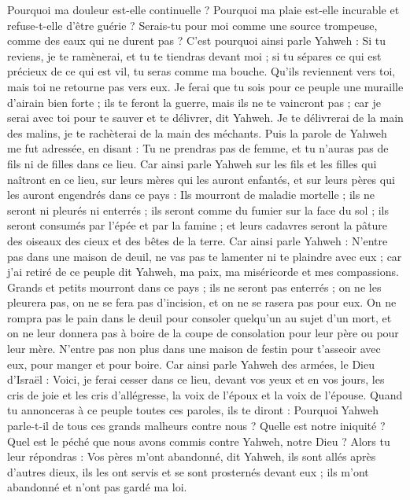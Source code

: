\begin{multicols}{2}
Pourquoi ma douleur est-elle continuelle ? Pourquoi ma plaie est-elle incurable et refuse-t-elle d'être guérie ? Serais-tu pour moi comme une source trompeuse, comme des eaux qui ne durent pas ?
C'est pourquoi ainsi parle Yahweh : Si tu reviens, je te ramènerai, et tu te tiendras devant moi ; si tu sépares ce qui est précieux de ce qui est vil, tu seras comme ma bouche. Qu'ils reviennent vers toi, mais toi ne retourne pas vers eux.
Je ferai que tu sois pour ce peuple une muraille d'airain bien forte ; ils te feront la guerre, mais ils ne te vaincront pas ; car je serai avec toi pour te sauver et te délivrer, dit Yahweh.
Je te délivrerai de la main des malins, je te rachèterai de la main des méchants.
\VerseOne{}Puis la parole de Yahweh me fut adressée, en disant :
Tu ne prendras pas de femme, et tu n'auras pas de fils ni de filles dans ce lieu.
Car ainsi parle Yahweh sur les fils et les filles qui naîtront en ce lieu, sur leurs mères qui les auront enfantés, et sur leurs pères qui les auront engendrés dans ce pays :
Ils mourront de maladie mortelle ; ils ne seront ni pleurés ni enterrés ; ils seront comme du fumier sur la face du sol ; ils seront consumés par l'épée et par la famine ; et leurs cadavres seront la pâture des oiseaux des cieux et des bêtes de la terre.
Car ainsi parle Yahweh : N'entre pas dans une maison de deuil, ne vas pas te lamenter ni te plaindre avec eux ; car j'ai retiré de ce peuple dit Yahweh, ma paix, ma miséricorde et mes compassions.
Grands et petits mourront dans ce pays ; ils ne seront pas enterrés ; on ne les pleurera pas, on ne se fera pas d'incision, et on ne se rasera pas pour eux.
On ne rompra pas le pain dans le deuil pour consoler quelqu'un au sujet d'un mort, et on ne leur donnera pas à boire de la coupe de consolation pour leur père ou pour leur mère.
N'entre pas non plus dans une maison de festin pour t'asseoir avec eux, pour manger et pour boire.
Car ainsi parle Yahweh des armées, le Dieu d'Israël : Voici, je ferai cesser dans ce lieu, devant vos yeux et en vos jours, les cris de joie et les cris d'allégresse, la voix de l'époux et la voix de l'épouse.
Quand tu annonceras à ce peuple toutes ces paroles, ils te diront : Pourquoi Yahweh parle-t-il de tous ces grands malheurs contre nous ? Quelle est notre iniquité ? Quel est le péché que nous avons commis contre Yahweh, notre Dieu ?
Alors tu leur répondras : Vos pères m'ont abandonné, dit Yahweh, ils sont allés après d'autres dieux, ils les ont servis et se sont prosternés devant eux ; ils m'ont abandonné et n'ont pas gardé ma loi.

\end{multicols}
